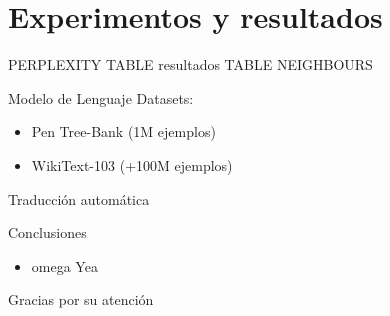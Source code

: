 \documentclass[aspectratio=169]{beamer}
\begin{document}
  
  \begin{frame}
  \end{frame}

  \section{Experimentos y resultados}
   PERPLEXITY
   TABLE resultados
   TABLE NEIGHBOURS


  \begin{frame}{Modelo de Lenguaje}
    Datasets:
    \begin{itemize}
      \item Pen Tree-Bank (1M ejemplos)
      \item WikiText-103 (+100M ejemplos)
    \end{itemize}
    
  \end{frame}

  \begin{frame}{Traducción automática}

  \end{frame}

  
  \begin{frame}{Conclusiones}

    \begin{itemize}
      \item omega Yea
    \end{itemize}
  \end{frame}
  
  \appendix

  \begin{frame}
    Gracias por su atención
  \end{frame}


  \begin{frame}[noframenumbering]

  \vspace{0.5cm}
  
  

  \end{frame}
\end{document}

